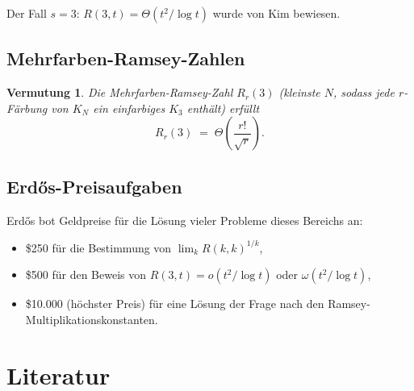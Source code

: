 \documentclass[12pt,a4paper]{amsart}
\newtheorem{conjecture}{Vermutung}
\theoremstyle{definition}
\theoremstyle{remark}
\begin{document}
Der Fall $s=3$: $R(3,t) = \Theta(t^2/\log t)$ wurde von Kim \cite{Kim1995} bewiesen.

\subsection{Mehrfarben-Ramsey-Zahlen}

\begin{conjecture}
Die Mehrfarben-Ramsey-Zahl $R_r(3)$ (kleinste $N$, sodass jede $r$-F\"arbung von
$K_N$ ein einfarbiges $K_3$ enth\"alt) erf\"ullt
\[
  R_r(3) \;=\; \Theta\!\left(\frac{r!}{\sqrt{r}}\right).
\]
\end{conjecture}

\subsection{Erd\H{o}s-Preisaufgaben}

Erd\H{o}s bot Geldpreise f\"ur die L\"osung vieler Probleme dieses Bereichs an:
\begin{itemize}[noitemsep]
  \item \$250 f\"ur die Bestimmung von $\lim_{k} R(k,k)^{1/k}$,
  \item \$500 f\"ur den Beweis von $R(3,t) = o(t^2/\log t)$ oder $\omega(t^2/\log t)$,
  \item \$10.000 (h\"ochster Preis) f\"ur eine L\"osung der Frage nach den Ramsey-Multiplikationskonstanten.
\end{itemize}

\section*{Literatur}
\end{document}
